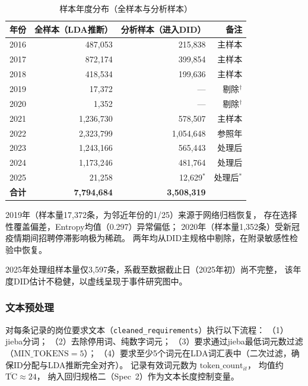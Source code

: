 \documentclass[12pt,a4paper]{ctexart}
\begin{document}
\begin{table}[H]
\centering
\caption{样本年度分布（全样本与分析样本）}
\begin{threeparttable}
\begin{tabular}{lrrr}
\toprule
年份 & 全样本（LDA推断） & 分析样本（进入DID） & 备注 \\
\midrule
2016 & 487,053 & 215,838 & 主样本 \\
2017 & 872,174 & 399,854 & 主样本 \\
2018 & 418,534 & 199,636 & 主样本 \\
2019 & 17,372  & ---     & 剔除$^\dagger$ \\
2020 & 1,352   & ---     & 剔除$^\dagger$ \\
2021 & 1,236,730 & 578,507 & 主样本 \\
2022 & 2,323,799 & 1,054,648 & 参照年 \\
2023 & 1,243,166 & 565,443 & 处理后 \\
2024 & 1,173,246 & 481,764 & 处理后 \\
2025 & 21,258   & 12,629$^*$ & 处理后$^*$ \\
\midrule
\textbf{合计} & \textbf{7,794,684} & \textbf{3,508,319} & \\
\bottomrule
\end{tabular}
\begin{tablenotes}
\small
\item[$\dagger$] 2019年（样本量17,372条，为邻近年份的1/25）来源于网络归档恢复，
存在选择性覆盖偏差，Entropy均值（0.297）异常偏低；
2020年（样本量1,352条）受新冠疫情期间招聘停滞影响极为稀疏。
两年均从DID主规格中剔除，在附录敏感性检验中恢复。
\item[$*$] 2025年处理组样本量仅3,597条，系截至数据截止日（2025年初）尚不完整，
该年度DID估计不稳健，以虚线呈现于事件研究图中。
\end{tablenotes}
\end{threeparttable}
\end{table}

\subsubsection{文本预处理}

对每条记录的岗位要求文本（\texttt{cleaned\_requirements}）执行以下流程：
（1）jieba分词；
（2）去除停用词、纯数字词元；
（3）要求通过jieba最低词元数过滤（$\text{MIN\_TOKENS} = 5$）；
（4）要求至少5个词元在LDA词汇表中（二次过滤，确保ID分配与LDA推断完全对齐）。
记录有效词元数为 $\text{token\_count}_{it}$，
均值约 $\overline{\text{TC}} \approx 24$，
纳入回归规格二（Spec~2）作为文本长度控制变量。
\end{document}
